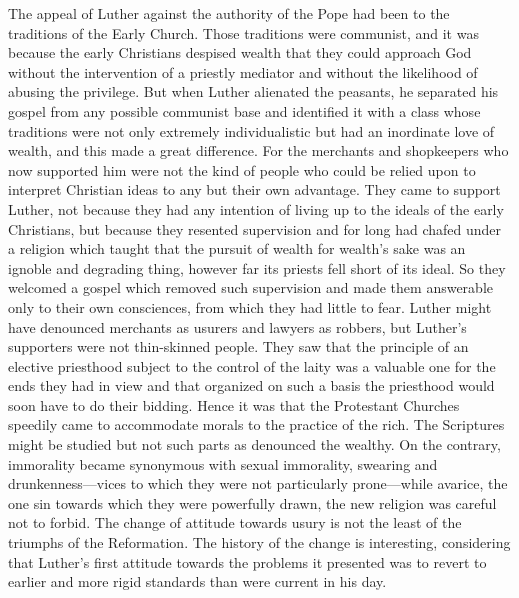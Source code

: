 \documentclass{book}
\begin{document}
The appeal of Luther against the authority of the Pope had been to the traditions of the Early Church. Those traditions were communist, and it was because the early Christians despised wealth that they could approach God without the intervention of a priestly mediator and without the likelihood of abusing the privilege. But when Luther alienated the peasants, he separated his gospel from any possible communist base and identified it with a class whose traditions were not only extremely individualistic but had an inordinate love of wealth, and this made a great difference. For the merchants and shopkeepers who now supported him were not the kind of people who could be relied upon to interpret Christian ideas to any but their own advantage. They came to support Luther, not because they had any intention of living up to the ideals of the early Christians, but because they resented supervision and for long had chafed under a religion which taught that the pursuit of wealth for wealth’s sake was an ignoble and degrading thing, however far its priests fell short of its ideal. So they welcomed a gospel which removed such supervision and made them answerable only to their own consciences, from which they had little to fear. Luther might have denounced merchants as usurers and lawyers as robbers, but Luther’s supporters were not thin-skinned people. They saw that the principle of an elective priesthood subject to the control of the laity was a valuable one for the ends they had in view and that organized on such a basis the priesthood would soon have to do their bidding. Hence it was that the Protestant Churches speedily came to accommodate morals to the practice of the rich. The Scriptures might be studied but not such parts as denounced the wealthy. On the contrary, immorality became synonymous with sexual immorality, swearing and drunkenness—vices to which they were not particularly prone—while avarice, the one sin towards which they were powerfully drawn, the new religion was careful not to forbid. The change of attitude towards usury is not the least of the triumphs of the Reformation. The history of the change is interesting, considering that Luther’s first attitude towards the problems it presented was to revert to earlier and more rigid standards than were current in his day.
\end{document}
